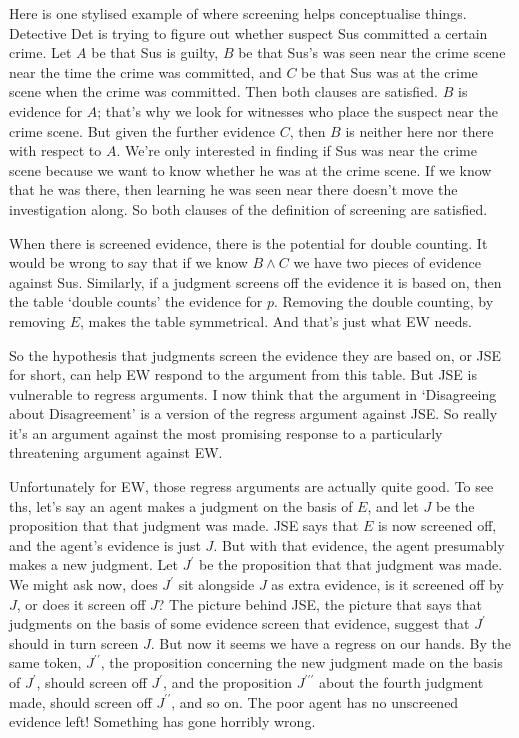 \documentclass[
  11pt,
  letterpaper,
  DIV=11,
  numbers=noendperiod,
  oneside]{scrartcl}
\begin{document}
Here is one stylised example of where screening helps conceptualise
things. Detective Det is trying to figure out whether suspect Sus
committed a certain crime. Let \(A\) be that Sus is guilty, \(B\) be
that Sus's was seen near the crime scene near the time the crime was
committed, and \(C\) be that Sus was at the crime scene when the crime
was committed. Then both clauses are satisfied. \(B\) is evidence for
\(A\); that's why we look for witnesses who place the suspect near the
crime scene. But given the further evidence \(C\), then \(B\) is neither
here nor there with respect to \(A\). We're only interested in finding
if Sus was near the crime scene because we want to know whether he was
at the crime scene. If we know that he was there, then learning he was
seen near there doesn't move the investigation along. So both clauses of
the definition of screening are satisfied.

When there is screened evidence, there is the potential for double
counting. It would be wrong to say that if we know \(B \wedge C\) we
have two pieces of evidence against Sus. Similarly, if a judgment
screens off the evidence it is based on, then the table `double counts'
the evidence for \(p\). Removing the double counting, by removing \(E\),
makes the table symmetrical. And that's just what EW needs.

So the hypothesis that judgments screen the evidence they are based on,
or JSE for short, can help EW respond to the argument from this table.
But JSE is vulnerable to regress arguments. I now think that the
argument in `Disagreeing about Disagreement' is a version of the regress
argument against JSE. So really it's an argument against the most
promising response to a particularly threatening argument against EW.

Unfortunately for EW, those regress arguments are actually quite good.
To see ths, let's say an agent makes a judgment on the basis of \(E\),
and let \(J\) be the proposition that that judgment was made. JSE says
that \(E\) is now screened off, and the agent's evidence is just \(J\).
But with that evidence, the agent presumably makes a new judgment. Let
\(J^\prime\) be the proposition that that judgment was made. We might
ask now, does \(J^\prime\) sit alongside \(J\) as extra evidence, is it
screened off by \(J\), or does it screen off \(J\)? The picture behind
JSE, the picture that says that judgments on the basis of some evidence
screen that evidence, suggest that \(J^\prime\) should in turn screen
\(J\). But now it seems we have a regress on our hands. By the same
token, \(J^{\prime \prime}\), the proposition concerning the new
judgment made on the basis of \(J^\prime\), should screen off
\(J^\prime\), and the proposition \(J^{\prime \prime \prime}\) about the
fourth judgment made, should screen off \(J^{\prime \prime}\), and so
on. The poor agent has no unscreened evidence left! Something has gone
horribly wrong.
\end{document}
